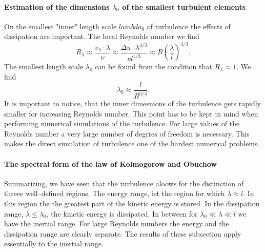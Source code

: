 \paragraph{Estimation of the dimensions 
$\lambda_0$ of the smallest turbulent elements}
On the smallest "inner" length scale $lambda_0$ of turbulence the effects of
dissipation are important. The local Reynolds number
we find
\begin{displaymath}
  R_{\lambda} \approx \frac{v_{\lambda}\cdot \lambda}{\nu}
              \approx \frac{\Delta u \cdot \lambda^{4/3}}{\nu l^{1/3}}
              \approx R \left( \frac{\lambda}{l}\right)^{4/3} .
\end{displaymath}
The smallest length scale $\lambda_0$ can be found from the condition that
$R_{\lambda} \approx 1$. We find
\begin{displaymath}
  \lambda_0 \approx \frac{l}{R^{3/4}}.
\end{displaymath}
It is important to notice, that the inner dimesnions of the turbulence gets
rapidly smaller for increasing Reynolds number. This point has to be kept in
mind when performing numerical simulations of the turbulence. For large values
of the Reynolds number a very large number of degrres of freedom is
necessary. This makes the direct simulation of turbulence one of the hardest
numerical problems. 

\paragraph{The spectral form of the law of Kolmogorow and Obuchow}
Summarizing, we have seen that the turbulence aloows for the distinction of
threee well--defined regions. The energy range, ist the region for which
$\lambda \approx l$. In this region the the greatest part of the kinetic
energy is stored. In the dissipation range, $\lambda \le \lambda_0$, the
kinetic energy is dissipated. In between for $\lambda_0 \ll \lambda \ll l$
we have the inertial range. For large
Reynolds numbers the energy and the dissipation range are clearly separate.
The results of these subsection apply essentially to the inertial range.

